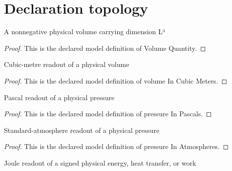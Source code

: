 \section{Declaration topology}
\begin{definition}
  \label{def:physics:phyx-mini-0435:phyxminiproblems-problemphyxmini0435-volumequantity}
  A nonnegative physical volume carrying dimension L³
\end{definition}
\begin{proof}
  This is the declared model definition of Volume Quantity.
\end{proof}
\begin{definition}
  \label{def:physics:phyx-mini-0435:phyxminiproblems-problemphyxmini0435-volumeincubicmeters}
  Cubic-metre readout of a physical volume
\end{definition}
\begin{proof}
  This is the declared model definition of volume In Cubic Meters.
\end{proof}
\begin{definition}
  \label{def:physics:phyx-mini-0435:phyxminiproblems-problemphyxmini0435-pressureinpascals}
  Pascal readout of a physical pressure
\end{definition}
\begin{proof}
  This is the declared model definition of pressure In Pascals.
\end{proof}
\begin{definition}
  \label{def:physics:phyx-mini-0435:phyxminiproblems-problemphyxmini0435-pressureinatmospheres}
  Standard-atmosphere readout of a physical pressure
\end{definition}
\begin{proof}
  This is the declared model definition of pressure In Atmospheres.
\end{proof}
\begin{definition}
  \label{def:physics:phyx-mini-0435:phyxminiproblems-problemphyxmini0435-energyinjoules}
  Joule readout of a signed physical energy, heat transfer, or work
\end{definition}
